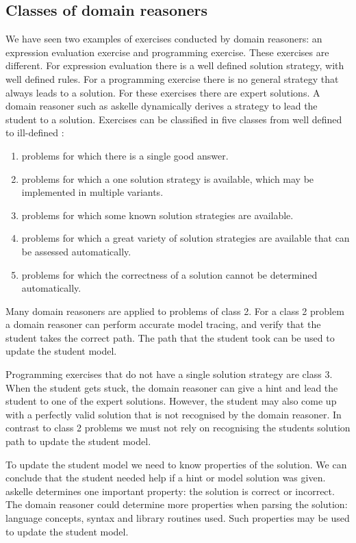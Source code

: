 \subsection{Classes of domain reasoners}
We have seen two examples of exercises conducted by domain reasoners: an expression evaluation exercise and programming exercise.
These exercises are different.
For expression evaluation there is a well defined solution strategy, with well defined rules. 
For a programming exercise there is no general strategy that always leads to a solution. 
For these exercises there are expert solutions. 
A domain reasoner such as \gls{askelle} dynamically derives a strategy to lead the student to a solution.
Exercises can be classified in five classes from well defined to ill-defined \citep{exerciseClasses}:
\begin{enumerate}
\item problems for which there is a single good answer.
\item problems for which a one solution strategy is available, which may be implemented in multiple variants.
\item problems for which some known solution strategies are available.
\item problems for which a great variety of solution strategies are available that can be assessed automatically.
\item problems for which the correctness of a solution cannot be determined automatically.
\end{enumerate}

Many domain reasoners are applied to problems of class 2. 
For a class 2 problem a domain reasoner can perform accurate model tracing, and verify that the student takes the correct path.
The path that the student took can be used to update the student model.

Programming exercises that do not have a single  solution strategy are class 3.
When the student gets stuck, the domain reasoner can give a hint and lead the student to one of the expert solutions.
However, the student may also come up with a perfectly valid solution that is not recognised by the domain reasoner.
In contrast to class 2 problems we must not rely on recognising the students solution path to update the student model.

To update the student model we need to know properties of the solution.
We can conclude that the student needed help if a hint or model solution was given. 
\gls{askelle}  determines one important property: the solution is correct or incorrect.
The domain reasoner could determine more properties when parsing the solution: language concepts, syntax and library routines used.
Such properties may be used to update the student model.

